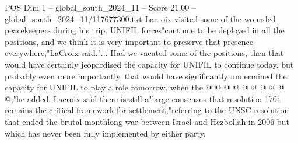 \begin{textsample}{POS Dim 1 – global\_south\_2024\_11 – Score 21.00 – global\_south\_2024\_11/117677300.txt}
Lacroix visited some of the wounded peacekeepers during his trip.
UNIFIL forces"continue to be deployed in all the positions, and we think it is very important to preserve that presence everywhere,"LaCroix said."...
Had we vacated some of the positions, then that would have certainly jeopardised the capacity for UNIFIL to continue today, but probably even more importantly, that would have significantly undermined the capacity for UNIFIL to play a role tomorrow, when the @ @ @ @ @ @ @ @ @ @,"he added.
Lacroix said there is still a"large consensus that resolution 1701 remains the critical framework for settlement,"referring to the UNSC resolution that ended the brutal monthlong war between Israel and Hezbollah in 2006 but which has never been fully implemented by either party.

\end{textsample}
